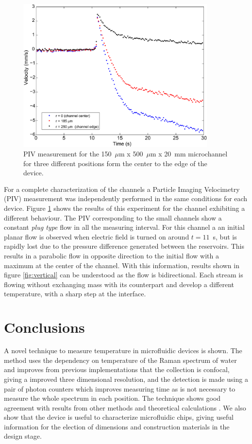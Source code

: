 \documentclass[]{spie}  %
\newcommand{\figsimple}{10cm} %
\begin{document}
\begin{figure}[h!t!b!]
\centering
\includegraphics[width=\figsimple]{figs/PIV2D.pdf}
\caption{PIV measurement for the 150~$\mu$m x 500~$\mu$m x 20~mm microchannel for three different positions form the center to the edge of the device. \label{fig:piv}}
\end{figure}
For a complete characterization of the channels a Particle Imaging Velocimetry (PIV) measurement was independently performed in the same conditions for each device. Figure \ref{fig:piv} shows the results of this experiment for the channel exhibiting a different behaviour. The PIV corresponding to the small channels show a constant \textit{plug type} flow in all the measuring interval. For this channel a an initial planar flow is observed when electric field is turned on around $t = 11$~s, but is rapidly lost due to the pressure difference generated between the reservoirs. This results in a parabolic flow in opposite direction to the initial flow with a maximum at the center of the channel. With this information, results shown in figure \ref{fig:vertical} can be understood as the flow is bidirectional. Each stream is flowing without exchanging mass with its counterpart and develop a different temperature, with a sharp step at the interface.
 


\section{Conclusions}

A novel technique to measure temperature in microfluidic devices is shown. The method uses the dependency on temperature of the Raman spectrum of water and improves from previous implementations that the collection is confocal, giving a improved three dimensional resolution, and the detection is made using a pair of photon counters which improves measuring time as is not necessary to measure the whole spectrum in each position. The technique shows good agreement with results from other methods and theoretical calculations \cite{erickson2003}. We also show that the device is useful to characterize microfluidic chips, giving useful information for the election of dimensions and construction materials in the design stage. 
\end{document}
